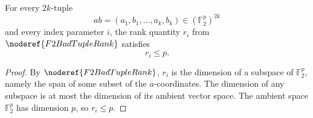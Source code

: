 \begin{helper}
For every \(2k\)-tuple
\[
  ab=(a_1,b_1,\ldots,a_k,b_k)\in(\mathbb F_2^p)^{2k}
\]
and every index parameter \(i\), the rank quantity \(r_i\) from
\(\noderef{F2BadTupleRank}\) satisfies
\[
  r_i\le p.
\]
\end{helper}
\begin{proof}
By \(\noderef{F2BadTupleRank}\), \(r_i\) is the dimension of a subspace of
\(\mathbb F_2^p\), namely the span of some subset of the \(a\)-coordinates. The
dimension of any subspace is at most the dimension of its ambient vector space.
The ambient space \(\mathbb F_2^p\) has dimension \(p\), so \(r_i\le p\).
\end{proof}
